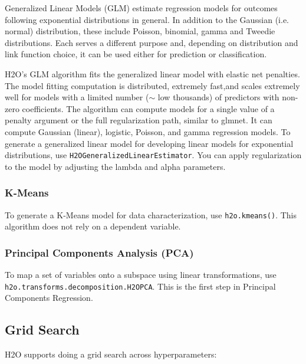 Generalized Linear Models (GLM) estimate regression models for
outcomes following exponential distributions in general. In
addition to the Gaussian (i.e. normal) distribution, these include
Poisson, binomial, gamma and Tweedie distributions. Each serves
a different purpose and, depending on distribution and link
function choice, it can be used either for prediction or
classification.

H2O's GLM algorithm fits the generalized linear model with
elastic net penalties. The model fitting computation is distributed,
extremely fast,and scales extremely well for models with a limited
number ($\sim$ low thousands) of predictors with non-zero
coefficients. The algorithm can compute models for a single value of a penalty argument or the full regularization path, similar to glmnet. It can compute Gaussian (linear), logistic, Poisson, and gamma regression models.
To generate a generalized linear model for developing
linear models for exponential distributions, use
{\texttt{H2OGeneralizedLinearEstimator}}. You can apply
regularization to the model by adjusting the lambda and alpha
parameters.



\subsubsection{K-Means}
To generate a K-Means model for data characterization, use
{\texttt{h2o.kmeans()}}. This algorithm does not rely on a
dependent variable.



\subsubsection{Principal Components Analysis (PCA)}
To map a set of variables onto a subspace using linear
transformations, use {\texttt{h2o.transforms.decomposition.H2OPCA}}.
This is the first step in Principal Components Regression.


\subsection{Grid Search}
H2O supports doing a grid search across hyperparameters:


